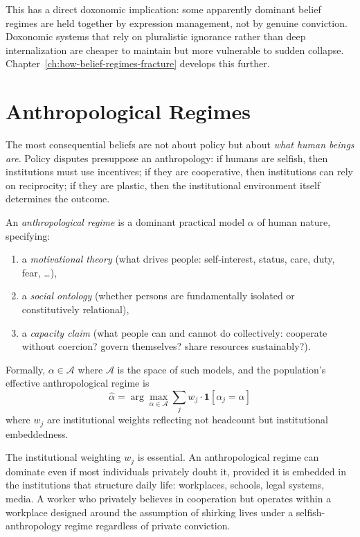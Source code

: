 This has a direct doxonomic implication: some apparently dominant belief regimes are held together by expression management, not by genuine conviction.
Doxonomic systems that rely on pluralistic ignorance rather than deep internalization are cheaper to maintain but more vulnerable to sudden collapse.
Chapter~\ref{ch:how-belief-regimes-fracture} develops this further.


\section{Anthropological Regimes}
\label{sec:ch2-anthropological}

The most consequential beliefs are not about policy but about \emph{what human beings are}.
Policy disputes presuppose an anthropology: if humans are selfish, then institutions must use incentives; if they are cooperative, then institutions can rely on reciprocity; if they are plastic, then the institutional environment itself determines the outcome.

\begin{definition}
\label{def:anthropological-regime}
An \emph{anthropological regime} is a dominant practical model $\alpha$ of human nature, specifying:
\begin{enumerate}[nosep]
  \item a \emph{motivational theory} (what drives people: self-interest, status, care, duty, fear, \ldots),
  \item a \emph{social ontology} (whether persons are fundamentally isolated or constitutively relational),
  \item a \emph{capacity claim} (what people can and cannot do collectively: cooperate without coercion? govern themselves? share resources sustainably?).
\end{enumerate}
Formally, $\alpha \in \mathcal{A}$ where $\mathcal{A}$ is the space of such models, and the population's effective anthropological regime is
\[
  \hat{\alpha} = \arg\max_{\alpha \in \mathcal{A}} \sum_j w_j \cdot \mathbf{1}[\alpha_j = \alpha]
\]
where $w_j$ are institutional weights reflecting not headcount but institutional embeddedness.
\end{definition}

The institutional weighting $w_j$ is essential.
An anthropological regime can dominate even if most individuals privately doubt it, provided it is embedded in the institutions that structure daily life: workplaces, schools, legal systems, media.
A worker who privately believes in cooperation but operates within a workplace designed around the assumption of shirking lives under a selfish-anthropology regime regardless of private conviction.

